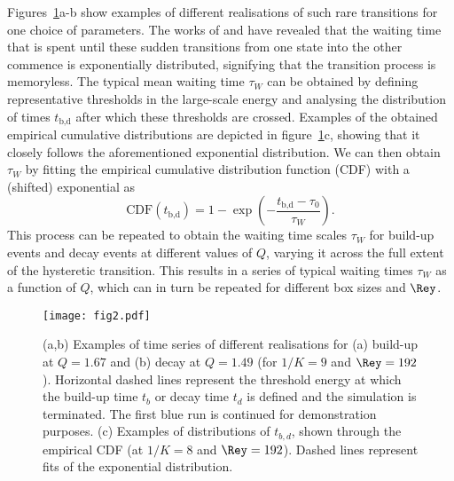 \documentclass[]{jfm}
\begin{document}
Figures~\ref{fig:transitions}a-b show examples of different realisations of such rare transitions for one choice of parameters. The works of \citet{VanKan2019a} and \citet{DeWit2022} have revealed that the waiting time that is spent until these sudden transitions from one state into the other commence is exponentially distributed, signifying that the transition process is memoryless. The typical mean waiting time $\tau_W$ can be obtained by defining representative thresholds in the large-scale energy and analysing the distribution of times $t_\textrm{b,d}$ after which these thresholds are crossed. Examples of the obtained empirical cumulative distributions are depicted in figure~\ref{fig:transitions}c, showing that it closely follows the aforementioned exponential distribution. We can then obtain $\tau_W$ by fitting the empirical cumulative distribution function (CDF) with a (shifted) exponential as
\begin{equation}
    \textrm{CDF}(t_\textrm{b,d})=1-\exp\left(-\frac{t_\textrm{b,d}-\tau_0}{\tau_W}\right).
\end{equation}
This process can be repeated to obtain the waiting time scales $\tau_W$ for build-up events and decay events at different values of $Q$, varying it across the full extent of the hysteretic transition. This results in a series of typical waiting times $\tau_W$ as a function of $Q$, which can in turn be repeated for different box sizes and $\Rey$.

\begin{figure}
    \centering
    \texttt{[image: fig2.pdf]}
    \caption{(a,b) Examples of time series of different realisations for (a) build-up at $Q=1.67$ and (b) decay at $Q=1.49$ (for $1/K=9$ and $\Rey=192$). Horizontal dashed lines represent the threshold energy at which the build-up time $t_b$ or decay time $t_d$ is defined and the simulation is terminated. The first blue run is continued for demonstration purposes. (c) Examples of distributions of $t_{b,d}$, shown through the empirical CDF (at $1/K=8$ and $\Rey=192$). Dashed lines represent fits of the exponential distribution.}
    \label{fig:transitions}
\end{figure}

\end{document}
